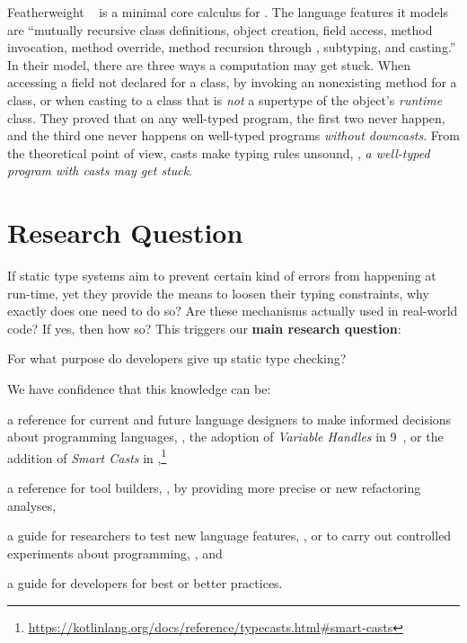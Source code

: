Featherweight \java{}~\citep{igarashiFeatherweightJavaMinimal2001} is a minimal core calculus for \java{}.
The language features it models are ``mutually recursive class definitions,
object creation, field access, method invocation, method override, method recursion through , subtyping, and casting.''
In their model, there are three ways a computation may get stuck.
When accessing a field not declared for a class,
by invoking an nonexisting method for a class,
or when casting to a class that is \emph{not} a supertype of the object's \emph{runtime} class.
They proved that on any well-typed program, the first two never happen,
and the third one never happens on well-typed programs \emph{without downcasts}.
From the theoretical point of view, casts make typing rules unsound, \ie{},
\emph{a well-typed program with casts may get stuck}.

\section{Research Question}

If static type systems aim to prevent certain kind of errors from happening at run-time,
yet they provide the means to loosen their typing constraints,
why exactly does one need to do so?
Are these mechanisms actually used in real-world code?
If yes, then how so?
This triggers our \textbf{main research question}:

\begin{mdframed}

\centering
For what purpose do developers give up static type checking?
\end{mdframed}

We have confidence that this knowledge can be:
\begin{inparaenum}[a)]
\item a reference for current and future language designers
to make informed decisions about programming languages,
\eg{}, the adoption of \emph{Variable Handles} in \java{} 9~\citep{jep193},
or the addition of \emph{Smart Casts} in ,\footnote{\url{https://kotlinlang.org/docs/reference/typecasts.html\#smart-casts}}
\item a reference for tool builders, \eg{}, by providing more precise or new refactoring analyses,
\item a guide for researchers to test new language features, \eg{}, \cite{wintherGuardedTypePromotion2011} or to carry out controlled experiments about programming, \eg{}, \cite{stuchlikStaticVsDynamic2011} and
\item a guide for developers for best or better practices.
\end{inparaenum}

